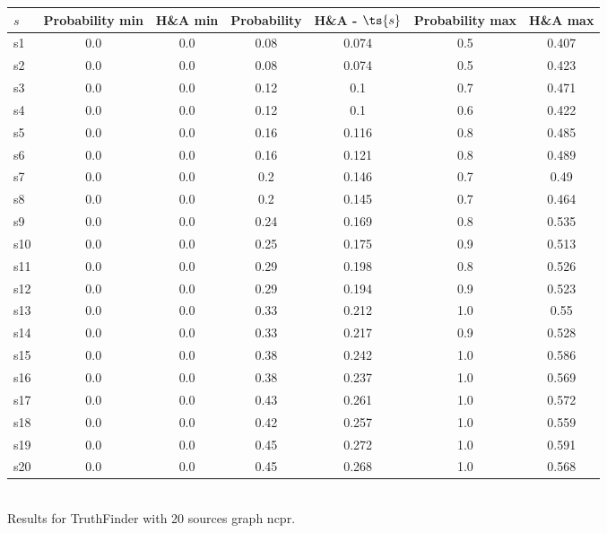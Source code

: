 \documentclass{article}
\begin{document}
\noindent\begin{tabular}{|l|c|c|c|c|c|c|}
\hline
$s$& Probability min & H\&A min & Probability & H\&A - $\ts{s}$ & Probability max & H\&A max\\
\hline
s1 &0.0 & 0.0 & 0.08 & 0.074 & 0.5 & 0.407\\
\hline
s2 &0.0 & 0.0 & 0.08 & 0.074 & 0.5 & 0.423\\
\hline
s3 &0.0 & 0.0 & 0.12 & 0.1 & 0.7 & 0.471\\
\hline
s4 &0.0 & 0.0 & 0.12 & 0.1 & 0.6 & 0.422\\
\hline
s5 &0.0 & 0.0 & 0.16 & 0.116 & 0.8 & 0.485\\
\hline
s6 &0.0 & 0.0 & 0.16 & 0.121 & 0.8 & 0.489\\
\hline
s7 &0.0 & 0.0 & 0.2 & 0.146 & 0.7 & 0.49\\
\hline
s8 &0.0 & 0.0 & 0.2 & 0.145 & 0.7 & 0.464\\
\hline
s9 &0.0 & 0.0 & 0.24 & 0.169 & 0.8 & 0.535\\
\hline
s10 &0.0 & 0.0 & 0.25 & 0.175 & 0.9 & 0.513\\
\hline
s11 &0.0 & 0.0 & 0.29 & 0.198 & 0.8 & 0.526\\
\hline
s12 &0.0 & 0.0 & 0.29 & 0.194 & 0.9 & 0.523\\
\hline
s13 &0.0 & 0.0 & 0.33 & 0.212 & 1.0 & 0.55\\
\hline
s14 &0.0 & 0.0 & 0.33 & 0.217 & 0.9 & 0.528\\
\hline
s15 &0.0 & 0.0 & 0.38 & 0.242 & 1.0 & 0.586\\
\hline
s16 &0.0 & 0.0 & 0.38 & 0.237 & 1.0 & 0.569\\
\hline
s17 &0.0 & 0.0 & 0.43 & 0.261 & 1.0 & 0.572\\
\hline
s18 &0.0 & 0.0 & 0.42 & 0.257 & 1.0 & 0.559\\
\hline
s19 &0.0 & 0.0 & 0.45 & 0.272 & 1.0 & 0.591\\
\hline
s20 &0.0 & 0.0 & 0.45 & 0.268 & 1.0 & 0.568\\
\hline
\end{tabular}\\

\noindent Results for TruthFinder with 20 sources graph ncpr.
\end{document}

